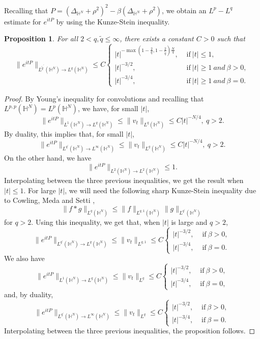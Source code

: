 \documentclass[10pt,leqno]{amsart}
\newcommand{\huom}[2][1=]{\todo[linecolor=red,backgroundcolor=red!10,bordercolor=red,#1]{#2}}
\newtheorem{prop}{Proposition}[section]
\numberwithin{equation}{section}
\newcommand{\field}[1]{\mathbb{#1}}
\newcommand{\Hy}{\field{H}}
\begin{document}
Recalling that $P=(\Delta_{\Hy^N} +\rho^2)^2  -\beta (\Delta_{\Hy^N} +\rho^2)$, we obtain an $L^p -L^q$ estimate for $e^{itP}$ by using the Kunze-Stein inequality.
\begin{prop}\label{disp}
 For all $2<q,\tilde{q}\leq \infty$, there exists a constant $C>0$ such that
$$\|e^{it P} \|_{L^{\tilde{q}^\prime } (\mathbb{H}^N) \rightarrow L^q  (\mathbb{H}^N)} \leq C\begin{cases} |t|^{-\max ( 1 - \frac{2}{q}, 1 - \frac{2}{\tilde{q}})\frac{N}{4}},&\mbox{ if}\ |t|\leq 1 ,\\ |t|^{-3/2},&\mbox{ if}\ |t|\geq 1\ and\ \beta>0,\\ |t|^{-3/4},&\mbox{ if}\ |t|\geq 1\ and\ \beta=0. \end{cases} $$
\end{prop}
\begin{proof}
By Young's inequality for convolutions and recalling that $L^{p,p}(\mathbb{H}^N)=L^p (\mathbb{H}^N)$, we have, for small $|t|$,
$$\|e^{itP} \|_{L^1  (\mathbb{H}^N) \rightarrow L^q  (\mathbb{H}^N)} \leq \|v_t\|_{L^q  (\mathbb{H}^N)}\leq C|t|^{-N/4},\ q>2  .$$
By duality, this implies that, for small $|t|$,
$$\|e^{itP} \|_{L^{q^\prime} (\mathbb{H}^N) \rightarrow L^\infty  (\mathbb{H}^N)} \leq \|v_t\|_{L^q  (\mathbb{H}^N)}\leq C|t|^{-N/4},\ q>2 .$$
On the other hand, we have
$$ \|e^{itP} \|_{L^2  (\mathbb{H}^N)\rightarrow L^2  (\mathbb{H}^N)} \leq  1.$$
Interpolating between the three previous inequalities, we get the result when $|t|\leq 1$. For large $|t|$, we will need the following sharp Kunze-Stein inequality due to Cowling, Meda and Setti \cite{cowling}, \cite{CoMeSe}
$$\|f\ast g\|_{L^q  (\mathbb{H}^N)}\leq \|f\|_{L^{q,1}  (\mathbb{H}^N)}  \|g\|_{L^{q^\prime}  (\mathbb{H}^N)}$$
 for $q>2$.
Using this inequality, we get that, when $|t|$ is large and $q>2$,
$$ \|e^{itP} \|_{L^{q^\prime}  (\mathbb{H}^N) \rightarrow L^q  (\mathbb{H}^N)} \leq  \|v_t\|_{L^{q,1}}\leq C\begin{cases}|t|^{-3/2},&\mbox{ if}\ \beta>0,\\ |t|^{-3/4},&\mbox{ if}\ \beta=0. \end{cases}$$
We also have
$$\|e^{itP} \|_{L^1   (\mathbb{H}^N)\rightarrow L^q  (\mathbb{H}^N)} \leq \|v_t\|_{L^q}\leq C\begin{cases}|t|^{-3/2},&\mbox{ if}\ \beta>0,\\ |t|^{-3/4},&\mbox{ if}\ \beta=0,\end{cases}$$
and, by duality,
$$\|e^{itP} \|_{L^{q^\prime}  (\mathbb{H}^N) \rightarrow L^\infty  (\mathbb{H}^N)} \leq \|v_t\|_{L^q}\leq C\begin{cases}|t|^{-3/2},&\mbox{ if}\ \beta>0,\\ |t|^{-3/4},&\mbox{ if}\ \beta=0. \end{cases}$$
Interpolating between the three previous inequalities, the proposition follows.
\end{proof}
\end{document}
